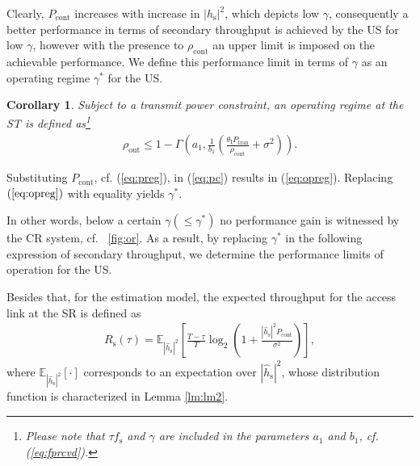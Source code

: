 \documentclass[12pt, draftclsnofoot, onecolumn]{IEEEtran}
\newcommand{\e}[2]{{\mathbb E}_{#1}\left[ #2 \right]}
\newcommand{\sub}[1]{_{\text{#1}}}
\newcommand{\opc}{\rho\sub{out}}
\newcommand{\pc}{\rho\sub{cont}}
\newcommand{\preg}{P\sub{cont}}
\newcommand{\ptran}{P\sub{tran}}
\newcommand{\ite}{\theta\sub{I}}
\newcommand{\rs}{R\sub{s}}
\newcommand{\epgs}{|\hat{h}\sub{s}|^2}
\newcommand{\pgs}{|h\sub{s}|^2}
\newcommand{\nps}{\sigma^2}
\newcommand{\fsam}{f\sub{s}}
\newtheorem{coro}{Corollary}
\begin{document}
Clearly, $\preg$ increases with increase in $\pgs$, which depicts low $\gamma$, consequently a better performance in terms of secondary throughput is achieved by the US for low $\gamma$, however with the presence to $\pc$ an upper limit is imposed on the achievable performance. We define this performance limit in terms of $\gamma$ as an operating regime $\gamma^*$ for the US. 
\begin{coro}
Subject to a transmit power constraint, an operating regime at the ST is defined as\footnote{Please note that $\tau \fsam$ and $\gamma$ are included in the parameters $a_1$ and $b_1$, cf. (\ref{eq:fprcvd}).} 
\begin{align}
\opc \le 1 - \Gamma\left(a_1, \frac{1}{b_1} \left( \frac{\ite \ptran}{\pc} + \nps  \right)  \right). \label{eq:opreg}  
\end{align}
\end{coro}
\begin{IEEEproof}
Substituting $\preg$, cf. (\ref{eq:preg}), in (\ref{eq:pc}) results in (\ref{eq:opreg}). Replacing $(\ref{eq:opreg})$ with equality yields $\gamma^*$. 
\end{IEEEproof}
In other words, below a certain $\gamma (\le \gamma^{*})$ no performance gain is witnessed by the CR system, cf. \figurename~\ref{fig:or}. As a result, by replacing $\gamma^*$ in the following expression of secondary throughput, we determine the performance limits of operation for the US. 
 
Besides that, for the estimation model, the expected throughput for the access link at the SR is defined as
\begin{align}
\rs(\tau) = \e{\epgs} {\frac{T - \tau}{T} \log_2 \left(1 + \frac{\epgs \preg }{\nps} \right)}, \label{eq:rs}
\end{align} 
where $\e{\epgs}{\cdot}$ corresponds to an expectation over $\epgs$, whose distribution function is characterized in Lemma \ref{lm:lm2}. 
\end{document}
